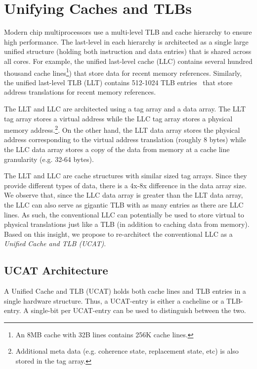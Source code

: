 \section{Unifying Caches and TLBs}
\label{sec:UCAT}

\noindent Modern chip multiprocessors use a multi-level TLB and cache
hierarchy to ensure high performance. The last-level in each hierarchy
is architected as a single large unified structure (holding both
instruction and data entries) that is shared across all cores. For
example, the unified last-level cache (LLC) contains several hundred
thousand cache lines\footnote{An 8MB cache with 32B lines contains
256K cache lines.}) that store data for recent memory references.
Similarly, the unified last-level TLB (LLT) contains 512-1024 TLB
entries~\cite{} that store address translations for recent memory
references.

The LLT and LLC are architected using a tag array and a data array.
The LLT tag array stores a virtual address while the LLC tag array
stores a physical memory address.\footnote{Additional meta data (e.g.
coherence state, replacement state, etc) is also stored in the tag
array.}. On the other hand, the LLT data array stores the physical
address corresponding to the virtual address translation (roughly 8
bytes) while the LLC data array stores a copy of the data from memory
at a cache line granularity (e.g. 32-64 bytes).

The LLT and LLC are cache structures with similar sized tag arrays.
Since they provide different types of data, there is a 4x-8x
difference in the data array size. We observe that, since the LLC data
array is greater than the LLT data array, the LLC can also serve as
gigantic TLB with as many entries as there are LLC lines. As such, the
conventional LLC can potentially be used to store virtual to physical
translations just like a TLB (in addition to caching data from
memory). Based on this insight, we propose to re-architect the
conventional LLC as a {\em Unified Cache and TLB (UCAT)}.

\subsection{UCAT Architecture}

\noindent A Unified Cache and TLB (UCAT) holds both cache lines and
TLB entries in a single hardware structure. Thus, a UCAT-entry is
either a cacheline or a TLB-entry. A single-bit per UCAT-entry can be
used to distinguish between the two.

